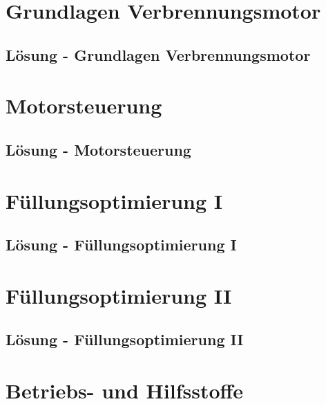 


\chapter{Grundlagen Verbrennungsmotor}
 \newpage
\section{Lösung - Grundlagen Verbrennungsmotor}

\chapter{Motorsteuerung}
 \newpage
\section{Lösung - Motorsteuerung}

\chapter{Füllungsoptimierung I}
 \newpage
\section{Lösung - Füllungsoptimierung I}

\chapter{Füllungsoptimierung II}
 \newpage
\section{Lösung - Füllungsoptimierung II}

\chapter{Betriebs- und Hilfsstoffe}
 \newpage
